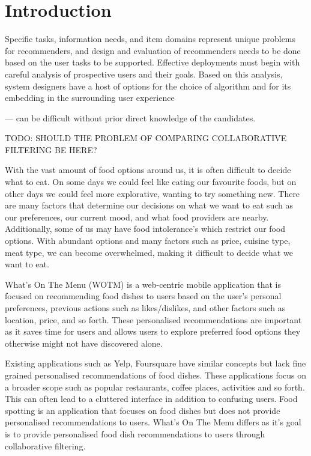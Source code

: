\chapter{Introduction}\label{C:intro}

Specific tasks, information needs, and item domains
represent unique problems for recommenders, and design and evaluation
of recommenders needs to be done based on the user tasks to
be supported. Effective deployments must begin with careful analysis
of prospective users and their goals. Based on this analysis, system
designers have a host of options for the choice of algorithm and for its
embedding in the surrounding user experience \cite{schafer2007collaborative}

— can be difficult
without prior direct knowledge of the candidates.

TODO: SHOULD THE PROBLEM OF COMPARING COLLABORATIVE FILTERING BE HERE?

With the vast amount of food options around us, it is often difficult to decide what to eat. On some days we could feel like eating our favourite foods, but on other days we could feel more explorative, wanting to try something new. There are many factors that determine our decisions on what we want to eat such as our preferences, our current mood, and what food providers are nearby. Additionally, some of us may have food intolerance's which restrict our food options. With abundant options and many factors such as price, cuisine type, meat type, we can become overwhelmed, making it difficult to decide what we want to eat. 

What’s On The Menu (WOTM) is a web-centric mobile application that is focused on recommending food dishes to users based on the user’s personal preferences, previous actions such as likes/dislikes, and other factors such as location, price, and so forth. These personalised recommendations are important as it saves time for users and allows users to explore preferred food options they otherwise might not have discovered alone. 

Existing applications such as Yelp, Foursquare have similar concepts but lack fine grained personalised recommendations of food dishes. These applications focus on a broader scope such as popular restaurants, coffee places, activities and so forth. This can often lead to a cluttered interface in addition to confusing users. Food spotting is an application that focuses on food dishes but does not provide personalised recommendations to users. What's On The Menu differs as it's goal is to provide personalised food dish recommendations to users through collaborative filtering. 

